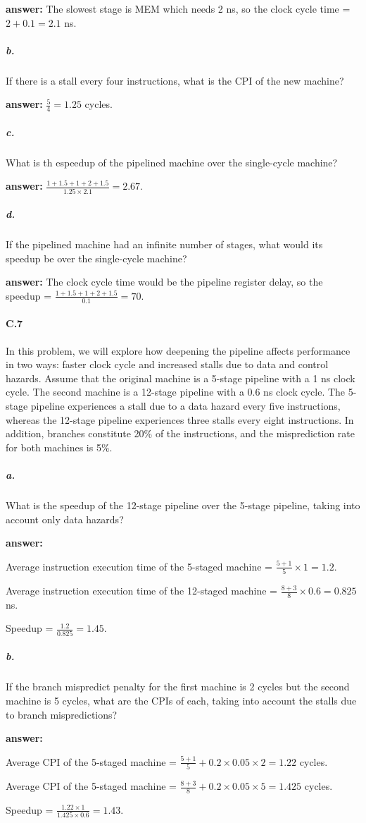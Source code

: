 \documentclass{article}
\begin{document}
\noindent \textbf{answer:} The slowest stage is MEM which needs 2 ns, so the clock cycle time = $2+0.1=2.1$ ns.

\subparagraph{b.} If there is a stall every four instructions, what is the CPI of the new machine? 

\noindent \textbf{answer:} $\frac{5}{4}=1.25$ cycles.

\subparagraph{c.} What is th espeedup of the pipelined machine over the single-cycle machine? 

\noindent \textbf{answer:} $\frac{1+1.5+1+2+1.5}{1.25\times 2.1}=2.67$.

\subparagraph{d.} If the pipelined machine had an infinite number of stages, what would its speedup be over the single-cycle machine?

\noindent \textbf{answer:} The clock cycle time would be the pipeline register delay, so the speedup =  $\frac{1+1.5+1+2+1.5}{0.1}=70$.

\paragraph{C.7} In this problem, we will explore how deepening the pipeline affects performance in two ways: faster clock cycle and increased stalls due to data and control hazards. Assume that the original machine is a 5-stage pipeline with a 1 ns clock cycle. The second machine is a 12-stage pipeline with a 0.6 ns clock cycle. The 5-stage pipeline experiences a stall due to a data hazard every five instructions, whereas the 12-stage pipeline experiences three stalls every eight instructions. In addition, branches constitute 20\% of the instructions, and the misprediction rate for both machines is 5\%. 

\subparagraph{a.} What is the speedup of the 12-stage pipeline over the 5-stage pipeline, taking into account only data hazards?

\noindent \textbf{answer:} 

Average instruction execution time of the 5-staged machine =  $\frac{5+1}{5}\times 1=1.2$.

Average instruction execution time of the 12-staged machine =  $\frac{8+3}{8}\times 0.6=0.825$ ns. 

Speedup = $\frac{1.2}{0.825} = 1.45$.

\subparagraph{b.} If the branch mispredict penalty for the first machine is 2 cycles but the second machine is 5 cycles, what are the CPIs of each, taking into account the stalls due to branch mispredictions? 

\noindent \textbf{answer:} 

Average CPI of the 5-staged machine =  $\frac{5+1}{5}+ 0.2\times0.05\times2=1.22$ cycles.

Average CPI of the 5-staged machine =  $\frac{8+3}{8}+ 0.2\times0.05\times5=1.425$ cycles.

Speedup = $\frac{1.22\times 1}{1.425\times 0.6} = 1.43$.
\end{document}
